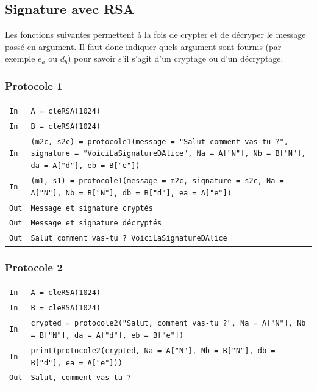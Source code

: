 \documentclass[titlepage]{article}
\begin{document}
    \subsection{Signature avec RSA}
    Les fonctions suivantes permettent à la fois de crypter et de décryper le message passé en argument. 
    Il faut donc indiquer quels argument sont fournis (par exemple $e_a$ ou $d_b$) pour savoir s'il s'agit d'un cryptage ou d'un décryptage.
    \subsubsection{Protocole 1}

    

    \begin{tabularx}{12cm}{|p{0.60cm}|X|}
        \hline
        \rowcolor{gray} \texttt{In} & \texttt{A = cleRSA(1024)} \\
        \rowcolor{gray} \texttt{In} & \texttt{B = cleRSA(1024)} \\
        \rowcolor{gray} \texttt{In} & \texttt{(m2c, s2c) = protocole1(message = "Salut comment vas-tu ?", signature = "VoiciLaSignatureDAlice", Na = A["N"], Nb = B["N"], da = A["d"], eb = B["e"])} \\
        \rowcolor{gray} \texttt{In} & \texttt{(m1, s1) = protocole1(message = m2c, signature = s2c, Na = A["N"], Nb = B["N"], db = B["d"], ea = A["e"])} \\
        \hline
        \texttt{Out} & \texttt{Message et signature cryptés} \\
        \texttt{Out} & \texttt{Message et signature décryptés} \\
        \texttt{Out} & \texttt{Salut comment vas-tu ? VoiciLaSignatureDAlice} \\
        \hline
    \end{tabularx}
    \bigbreak

    \subsubsection{Protocole 2}

    

    \begin{tabularx}{12cm}{|p{0.60cm}|X|}
        \hline
        \rowcolor{gray} \texttt{In} & \texttt{A = cleRSA(1024)} \\
        \rowcolor{gray} \texttt{In} & \texttt{B = cleRSA(1024)} \\
        \rowcolor{gray} \texttt{In} & \texttt{crypted = protocole2("Salut, comment vas-tu ?", Na = A["N"], Nb = B["N"], da = A["d"], eb = B["e"])} \\
        \rowcolor{gray} \texttt{In} & \texttt{print(protocole2(crypted, Na = A["N"], Nb = B["N"], db = B["d"], ea = A["e"]))} \\
        \hline
        \texttt{Out} & \texttt{Salut, comment vas-tu ?} \\
        \hline
    \end{tabularx}
    \bigbreak
\end{document}
